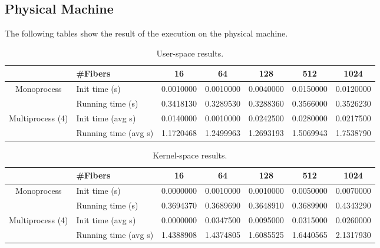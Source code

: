 \documentclass[11pt]{article}
\begin{document}
\subsection{Physical Machine}
The following tables show the result of the execution on the physical machine.

\begin{center}
\begin{table}[H]
\begin{tabular}{|c|l|c|c|c|c|c|}
\hline
\multicolumn{1}{|l|}{}            & \#Fibers             & 16        & 64        & 128       & 512       & 1024      \\ \hline
\multirow{2}{*}{Monoprocess}      & Init time (s)        & 0.0010000 & 0.0010000 & 0.0040000 & 0.0150000 & 0.0120000 \\ \cline{2-7} 
                                  & Running time (s)     & 0.3418130 & 0.3289530 & 0.3288360 & 0.3566000 & 0.3526230 \\ \hline
\multirow{2}{*}{Multiprocess (4)} & Init time (avg s)    & 0.0140000 & 0.0010000 & 0.0242500 & 0.0280000 & 0.0217500 \\ \cline{2-7} 
                                  & Running time (avg s) & 1.1720468 & 1.2499963 & 1.2693193 & 1.5069943 & 1.7538790 \\ \hline
\end{tabular}
\caption{User-space results.}
\label{table:t3}
\end{table}
\end{center}



\begin{center}
\begin{table}[H]
\begin{tabular}{|c|l|c|c|c|c|c|}
\hline
\multicolumn{1}{|l|}{}            & \#Fibers             & 16        & 64        & 128       & 512       & 1024      \\ \hline
\multirow{2}{*}{Monoprocess}      & Init time (s)        & 0.0000000 & 0.0010000 & 0.0010000 & 0.0050000 & 0.0070000 \\ \cline{2-7} 
                                  & Running time (s)     & 0.3694370 & 0.3689690 & 0.3648910 & 0.3689900 & 0.4343290 \\ \hline
\multirow{2}{*}{Multiprocess (4)} & Init time (avg s)    & 0.0000000 & 0.0347500 & 0.0095000 & 0.0315000 & 0.0260000 \\ \cline{2-7} 
                                  & Running time (avg s) & 1.4388908 & 1.4374805 & 1.6085525 & 1.6440565 & 2.1317930 \\ \hline
\end{tabular}
\caption{Kernel-space results.}
\label{table:t4}
\end{table}
\end{center}
\end{document}
